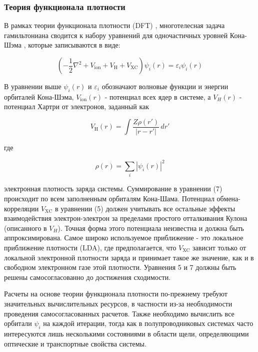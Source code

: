 \documentclass[a4paper,14pt]{extarticle}
\begin{document}
\subsubsection{Теория функционала плотности}

В рамках теории функционала плотности (DFT) , многотелесная задача гамильтониана сводится к набору уравнений для одночастичных уровней Кона-Шэма , которые записываются в виде:

\begin{equation}
    \left( -\frac{1}{2} \nabla^2 + V_{\text{ion}} + V_{\text{H}} + V_{\text{XC}} \right) \psi_i(r) = \varepsilon_i \psi_i(r)
    \end{equation}
    
В уравнении выше $\psi_i(r)$ и $\varepsilon_i$ обозначают волновые функции и энергии орбиталей Кона-Шэма, $V_{\text{ion}}(r)$ - потенциал всех ядер в системе, а $V_H(r)$ - потенциал Хартри от электронов, заданный как

\begin{equation}
    V_{\text{H}}(r) = \int \frac{Z \rho(r')}{|r - r'|} \, dr'
    \end{equation}

где

\begin{equation}
    \rho(r) = \sum_{i} |\psi_i(r)|^2
    \end{equation}

электронная плотность заряда системы. Суммирование в уравнении (7) происходит по всем заполненным орбиталям Кона-Шама. Потенциал обмена-корреляции $V_{\text{XC}}$ в уравнении (5) должен учитывать все остальные эффекты взаимодействия электрон-электрон за пределами простого отталкивания Кулона (описанного в $V_H$). Точная форма этого потенциала неизвестна и должна быть аппроксимирована. Самое широко используемое приближение - это локальное приближение плотности (LDA), где предполагается, что $V_{\text{XC}}$ зависит только от локальной электронной плотности заряда и принимает такое же значение, как и в свободном электронном газе этой плотности. Уравнения 5 и 7 должны быть решены самосогласованно до достижения сходимости.

Расчеты на основе теории функционала плотности по-прежнему требуют значительных вычислительных ресурсов, в частности из-за необходимости проведения самосогласованных расчетов. Также необходимо вычислить все орбитали $\psi_i$ на каждой итерации, тогда как в полупроводниковых системах часто интересуются лишь несколькими состояниями в области щели, определяющими оптические и транспортные свойства системы.
\end{document}
